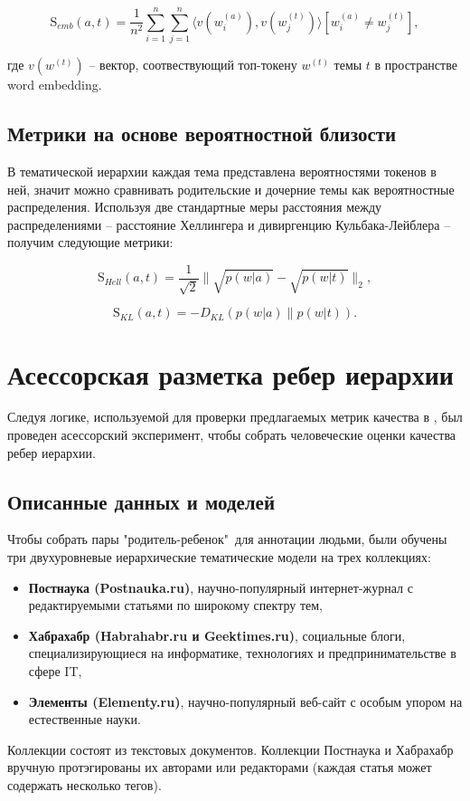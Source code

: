 $$\mathrm{S}_{emb}(a, t) = \dfrac{1}{n^2}\sum\limits_{i=1}^n \sum\limits_{j=1}^n \langle v(w^{(a)}_i), v(w^{(t)}_j)\rangle[w_i^{(a)} \neq w_j^{(t)}],$$ 

где $v(w^{(t)})$ -- вектор, соотвествующий топ-токену $w^{(t)}$ темы $t$ в пространстве word embedding.

\subsection{Метрики на основе вероятностной близости}
В тематической иерархии каждая тема представлена вероятностями токенов в ней, значит можно сравнивать родительские и дочерние темы как вероятностные распределения. Используя две стандартные меры расстояния между распределениями -- расстояние Хеллингера и дивиргенцию Кульбака-Лейблера -- получим следующие метрики:

$$ \mathrm{S}_{Hell}(a, t) = \dfrac{1}{\sqrt{2}} \| \sqrt{p(w|a)} - \sqrt{p(w|t)}\|_2,$$

$$\mathrm{S}_{KL}(a, t) = -D_{KL}(p(w|a)\|p(w|t)).$$

\section{Асессорская разметка ребер иерархии}
Следуя логике, используемой для проверки предлагаемых метрик качества в \cite{Mimno2011, Nikolenko2016}, был проведен асессорский эксперимент, чтобы собрать человеческие оценки качества ребер иерархии.

\subsection{Описанные данных и моделей}
Чтобы собрать пары "родитель-ребенок"\ для аннотации людьми, были обучены три двухуровневые иерархические тематические модели на трех коллекциях:
\begin{itemize}
\item \textbf{Постнаука (Postnauka.ru)}, научно-популярный интернет-журнал с редактируемыми статьями по широкому спектру тем,
\item \textbf{Хабрахабр (Habrahabr.ru и Geektimes.ru)}, социальные блоги, специализирующиеся на информатике, технологиях и предпринимательстве в сфере IT,
\item \textbf{Элементы (Elementy.ru)}, научно-популярный веб-сайт с особым упором на естественные науки.
\end{itemize}

Коллекции состоят из текстовых документов. Коллекции Постнаука и Хабрахабр вручную протэгированы их авторами или редакторами (каждая статья может содержать несколько тегов).

